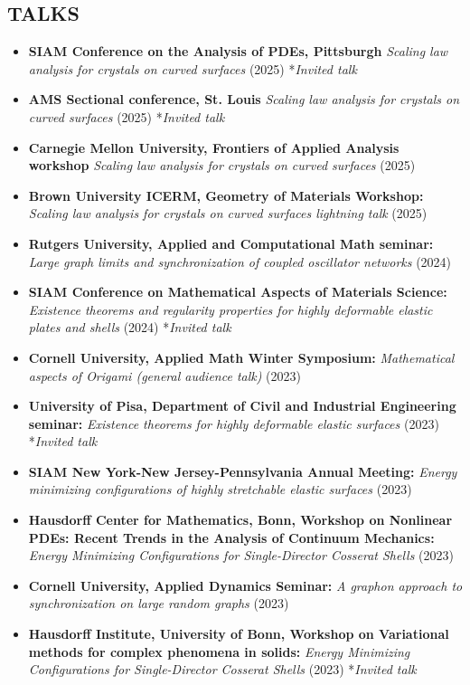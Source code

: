\documentclass[margin]{res} %
\begin{document}
\begin{resume}
\section{TALKS}
\begin{itemize}
	\item \textbf{SIAM Conference on the Analysis of PDEs, Pittsburgh} \textit{Scaling law analysis for crystals on curved surfaces} (2025) *\textit{Invited talk}
	\item \textbf{AMS Sectional conference, St. Louis} \textit{Scaling law analysis for crystals on curved surfaces} (2025) *\textit{Invited talk}
	\item \textbf{Carnegie Mellon University, Frontiers of Applied Analysis workshop} \textit{Scaling law analysis for crystals on curved surfaces} (2025)
	\item \textbf{Brown University ICERM, Geometry of Materials Workshop:} \textit{Scaling law analysis for crystals on curved surfaces lightning talk} (2025)
	\item \textbf{Rutgers University, Applied and Computational Math seminar:} \textit{Large graph limits and synchronization of coupled oscillator networks} (2024)
	\item \textbf{SIAM Conference on Mathematical Aspects of Materials Science:} \textit{Existence theorems and regularity properties for highly deformable elastic plates and shells} (2024) *\textit{Invited talk}
	\item \textbf{Cornell University, Applied Math Winter Symposium:} \textit{Mathematical aspects of Origami (general audience talk)} (2023)
	\item \textbf{University of Pisa, Department of Civil and Industrial Engineering seminar:} \textit{Existence theorems for highly deformable elastic surfaces} (2023) *\textit{Invited talk}
	\item \textbf{SIAM New York-New Jersey-Pennsylvania Annual Meeting:} \textit{Energy minimizing configurations of highly stretchable elastic surfaces} (2023)
	\item \textbf{Hausdorff Center for Mathematics, Bonn, Workshop on Nonlinear PDEs: Recent Trends in the Analysis of Continuum Mechanics:} \textit{Energy Minimizing Configurations for Single-Director Cosserat Shells} (2023) 
	\item \textbf{Cornell University, Applied Dynamics Seminar:} \textit{A graphon approach to synchronization on large random graphs} (2023)
	\item \textbf{Hausdorff Institute, University of Bonn, Workshop on Variational methods for complex phenomena in solids:} \textit{Energy Minimizing Configurations for Single-Director Cosserat Shells} (2023) *\textit{Invited talk}

\end{itemize}
\end{resume}
\end{document}
